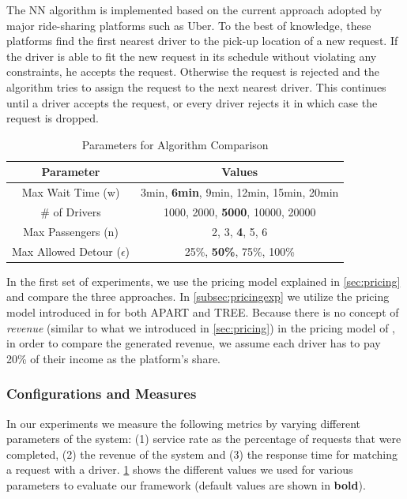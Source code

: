 The NN algorithm is implemented based on the current approach adopted by major ride-sharing platforms such as Uber. To the best of knowledge, these platforms find the first nearest driver to the pick-up location of a new request. If the driver is able to fit the new request in its schedule without violating any constraints, he accepts the request. Otherwise the request is rejected and the algorithm tries to assign the request to the next nearest driver. This continues until a driver accepts the request, or every driver rejects it in which case the request is dropped.

\begin{table}[!ht]
	\begin{center}
		\begin{tabular}{|c|c|}
			\hline
			Parameter & Values \\
			\hline \hline
			Max Wait Time (w) & 3min, \textbf{6min}, 9min, 12min, 15min, 20min \\ 
			\hline
			\# of Drivers & 1000, 2000, \textbf{5000},  10000, 20000\\ 
			\hline
			Max Passengers (n) & 2, 3, \textbf{4}, 5, 6 \\
			\hline
			Max Allowed Detour ($\epsilon$) & 25\%, \textbf{50\%}, 75\%, 100\%\\
			\hline
		\end{tabular}
		\caption{Parameters for Algorithm Comparison}
		\label{tab:params}
	\end{center}
	\vspace{-5mm}
\end{table}

In the first set of experiments, we use the pricing model explained in \cref{sec:pricing} and compare the three approaches. In \cref{subsec:pricingexp} we utilize the pricing model introduced in \cite{Ma15} for both APART and TREE. Because there is no concept of \textit{revenue} (similar to what we introduced in \cref{sec:pricing}) in the pricing model of \cite{Ma15}, in order to compare the generated revenue, we assume each driver has to pay 20\% of their income as the platform's share.

\subsubsection{Configurations and Measures}
In our experiments we measure the following metrics by varying different parameters of the system: (1) service rate as the percentage of requests that were completed, (2) the revenue of the system and (3) the response time for matching a request with a driver. \cref{tab:params} shows the different values we used for various parameters to evaluate our framework (default values are shown in \textbf{bold}).

